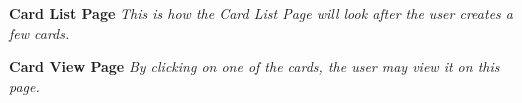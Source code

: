 \documentclass[12pt]{article}%
\begin{document}
\begin{center}
    \clearpage
    {\bf \Large Card List Page}
    {\it This is how the Card List Page will look after the user creates a few cards.}
    
    \clearpage
    {\bf \Large Card View Page}
    {\it By clicking on one of the cards, the user may view it on this page.}
    

\end{center}
\end{document}
